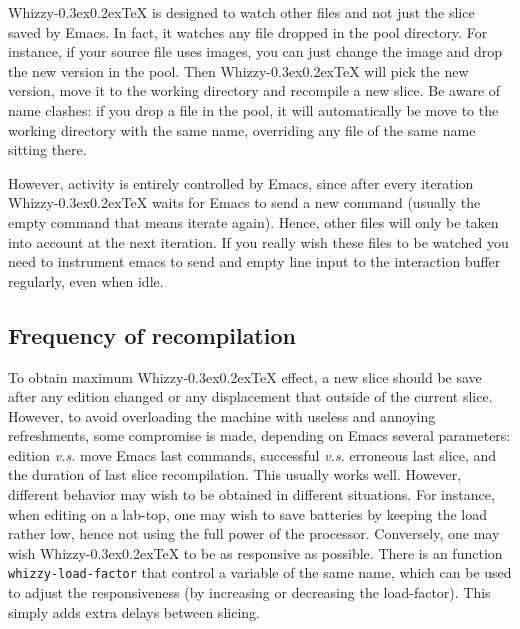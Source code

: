 \documentclass[12pt]{article}
\makeatletter
\let \lst \verb
\def \whizzy {{Whizzy\kern -0.3ex\raise 0.2ex\hbox{\let \@\relax\TeX}}}
\makeatother
\begin{document}
{\whizzy} is designed to watch other files and not just the slice saved by
Emacs. In fact, it watches any file dropped in the pool directory. 
For instance, 
if your source file uses images, you can just change the image and
drop the new version in the pool. Then {\whizzy} will pick the new version,
move it to the working directory and recompile a new slice. Be aware of name
clashes: if you drop a file in the pool, it will automatically be move to
the working directory with the same name, overriding any file of the same
name sitting there. 

However, activity is entirely controlled by Emacs, since after every
iteration {\whizzy} waits for Emacs to send a new command (usually the empty
command that means iterate again). Hence, other files will only be taken
into account at the next iteration. If you really wish these files
to be watched you need to instrument emacs to send and empty line input to
the interaction buffer regularly, even when idle. 

\subsection {Frequency of recompilation} 

To obtain maximum {\whizzy} effect, a new slice should be save after any
edition changed or any displacement that outside of the current slice.
However, to avoid overloading the machine with useless and annoying
refreshments, some compromise is made, depending on Emacs several
parameters: edition {\em v.s.} move Emacs last commands, 
successful {\em v.s.} erroneous last slice, and the duration of last slice
recompilation. This usually works well. However, different behavior may wish
to be obtained in different situations. For instance, when editing on a
lab-top, one may wish to save batteries by keeping the load rather low, hence
not using the full power of the processor. Conversely, one may wish 
{\whizzy} to be as responsive as possible. There is an function
\lst"whizzy-load-factor" that control a variable of the same name, which can
be used to adjust the responsiveness (by increasing or decreasing the
load-factor). This simply adds extra delays between slicing. 
\end{document}
